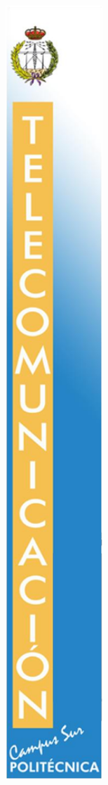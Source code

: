 \documentclass[../../memoria.tex]{subfiles}
\begin{document}
\noindent
\begin{minipage}[t]{.2\textwidth}
    \raggedright
    \begin{figure}[H]
        \includegraphics[width=0.82\textwidth,left]{logoupm.png}
    \end{figure}
\end{minipage}%
\end{document}
